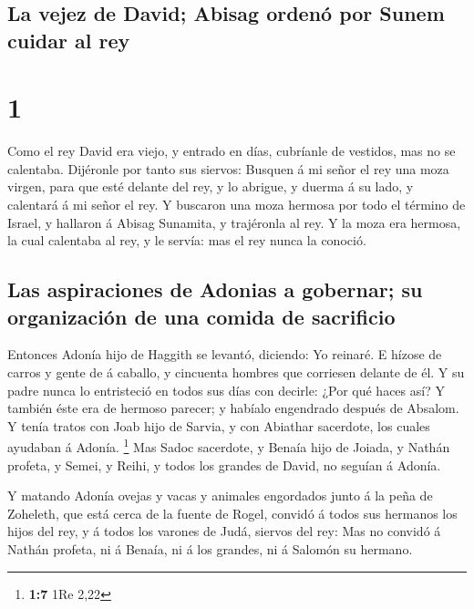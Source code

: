 \hypertarget{la-vejez-de-david-abisag-ordenuxf3-por-sunem-cuidar-al-rey}{%
\subsection{La vejez de David; Abisag ordenó por Sunem cuidar al
rey}\label{la-vejez-de-david-abisag-ordenuxf3-por-sunem-cuidar-al-rey}}

\hypertarget{section}{%
\section{1}\label{section}}

 Como el rey David era viejo, y entrado en días, cubríanle
de vestidos, mas no se calentaba.  Dijéronle por tanto sus
siervos: Busquen á mi señor el rey una moza virgen, para que esté
delante del rey, y lo abrigue, y duerma á su lado, y calentará á mi
señor el rey.  Y buscaron una moza hermosa por todo el
término de Israel, y hallaron á Abisag Sunamita, y trajéronla al rey.
 Y la moza era hermosa, la cual calentaba al rey, y le
servía: mas el rey nunca la conoció.

\hypertarget{las-aspiraciones-de-adonias-a-gobernar-su-organizaciuxf3n-de-una-comida-de-sacrificio}{%
\subsection{Las aspiraciones de Adonias a gobernar; su organización de
una comida de
sacrificio}\label{las-aspiraciones-de-adonias-a-gobernar-su-organizaciuxf3n-de-una-comida-de-sacrificio}}

 Entonces Adonía hijo de Haggith se levantó, diciendo: Yo
reinaré. E hízose de carros y gente de á caballo, y cincuenta hombres
que corriesen delante de él.  Y su padre nunca lo
entristeció en todos sus días con decirle: ¿Por qué haces así? Y también
éste era de hermoso parecer; y habíalo engendrado después de Absalom.
 Y tenía tratos con Joab hijo de Sarvia, y con Abiathar
sacerdote, los cuales ayudaban á Adonía. \footnote{\textbf{1:7} 1Re 2,22}
 Mas Sadoc sacerdote, y Benaía hijo de Joiada, y Nathán
profeta, y Semei, y Reihi, y todos los grandes de David, no seguían á
Adonía.

 Y matando Adonía ovejas y vacas y animales engordados
junto á la peña de Zoheleth, que está cerca de la fuente de Rogel,
convidó á todos sus hermanos los hijos del rey, y á todos los varones de
Judá, siervos del rey:  Mas no convidó á Nathán profeta,
ni á Benaía, ni á los grandes, ni á Salomón su hermano.

